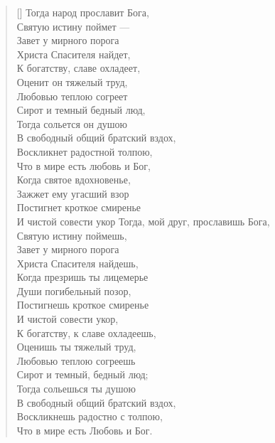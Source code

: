\newpage
\vspace*{0cm}


\settowidth{\versewidth}{Тогда народ прославит Бога}
\begin{verse}[\versewidth]
Тогда народ прославит Бога,\\ %
Святую истину поймет ---\\
Завет у мирного порога\\
Христа Спасителя найдет,\\
К богатству, славе охладеет,\\
Оценит он тяжелый труд,\\
Любовью теплою согреет\\
Сирот и темный бедный люд,\\
Тогда сольется он душою\\
В свободный общий братский вздох,\\
Воскликнет радостной толпою,\\
Что в мире есть любовь и Бог,\\
Когда святое вдохновенье,\\
Зажжет ему угасший взор\ldotst\\
Постигнет кроткое смиренье\\
И чистой совести укор\ldotst
Тогда, мой друг, прославишь Бога,\\
    Святую истину поймешь, \\
Завет у мирного порога\\
    Христа Спасителя найдешь, \\
Когда презришь ты лицемерье\\
    Души погибельный позор,\\
Постигнешь кроткое смиренье\\
    И чистой совести укор,\\
К богатству, к славе охладеешь,\\
    Оценишь ты тяжелый труд,\\
Любовью теплою согреешь\\
    Сирот и темный, бедный люд;\\
Тогда сольешься ты душою\\
    В свободный общий братский вздох,\\
Воскликнешь радостно с толпою,\\
    Что в мире есть Любовь и Бог.
\fi
\end{verse}


